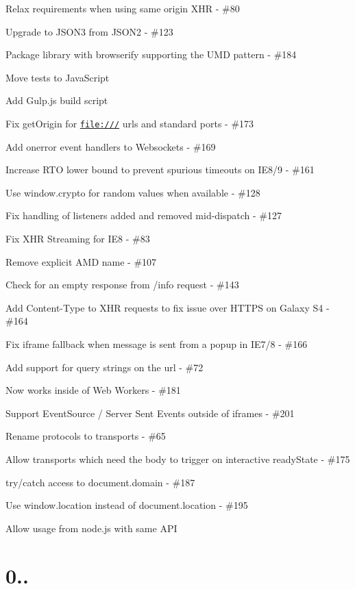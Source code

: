 \begin{DoxyItemize}
\item Relax requirements when using same origin X\+HR -\/ \#80
\item Upgrade to J\+S\+O\+N3 from J\+S\+O\+N2 -\/ \#123
\item Package library with browserify supporting the U\+MD pattern -\/ \#184
\item Move tests to Java\+Script
\item Add Gulp.\+js build script
\item Fix get\+Origin for \href{file:///}{\tt file\+:///} urls and standard ports -\/ \#173
\item Add onerror event handlers to Websockets -\/ \#169
\item Increase R\+TO lower bound to prevent spurious timeouts on I\+E8/9 -\/ \#161
\item Use window.\+crypto for random values when available -\/ \#128
\item Fix handling of listeners added and removed mid-\/dispatch -\/ \#127
\item Fix X\+HR Streaming for I\+E8 -\/ \#83
\item Remove explicit A\+MD name -\/ \#107
\item Check for an empty response from /info request -\/ \#143
\item Add Content-\/\+Type to X\+HR requests to fix issue over H\+T\+T\+PS on Galaxy S4 -\/ \#164
\item Fix iframe fallback when message is sent from a popup in I\+E7/8 -\/ \#166
\item Add support for query strings on the url -\/ \#72
\item Now works inside of Web Workers -\/ \#181
\item Support Event\+Source / Server Sent Events outside of iframes -\/ \#201
\item Rename protocols to transports -\/ \#65
\item Allow transports which need the body to trigger on \textquotesingle{}interactive\textquotesingle{} ready\+State -\/ \#175
\item try/catch access to document.\+domain -\/ \#187
\item Use {\ttfamily window.\+location} instead of {\ttfamily document.\+location} -\/ \#195
\item Allow usage from node.\+js with same A\+PI
\end{DoxyItemize}

\section*{0.. }


